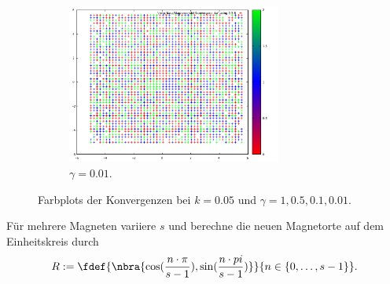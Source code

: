 \documentclass[
    oneside,
    ngerman,
    footinclude=false,
    captions=tableheading,
    DIV=12
]{scrartcl}
\begin{document}
\begin{figure}[H]
\begin{subfigure}[b]{0.49\textwidth}
            \includegraphics[width=7cm]{../Simulation/img/Farbbild-g001.png}
            \caption{$\gamma = 0.01$.}
        \end{subfigure}
        \caption{Farbplots der Konvergenzen bei $k = 0.05$ und $\gamma = 1,0.5,0.1,0.01$.}
    \end{figure}

\subaufgabe{}
    Für mehrere Magneten variiere $s$ und berechne die neuen Magnetorte auf dem Einheitskreis durch 
    \[
        R:=\fdef{\nbra{\cos(\frac{n\cdot \pi}{s - 1}),\sin(\frac{n\cdot pi}{s - 1})}}{n\in\{0,\dots,s-1\}}.
    \]
    
\end{document}
